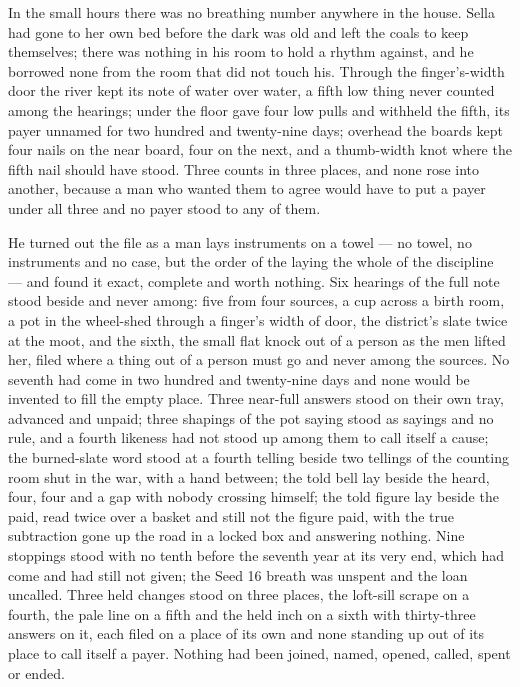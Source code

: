 In the small hours there was no breathing number anywhere in the house. Sella had gone to her own bed before the dark was old and left the coals to keep themselves; there was nothing in his room to hold a rhythm against, and he borrowed none from the room that did not touch his. Through the finger's-width door the river kept its note of water over water, a fifth low thing never counted among the hearings; under the floor  gave four low pulls and withheld the fifth, its payer unnamed for two hundred and twenty-nine days; overhead the boards kept four nails on the near board, four on the next, and a thumb-width knot where the fifth nail should have stood. Three counts in three places, and none rose into another, because a man who wanted them to agree would have to put a payer under all three and no payer stood to any of them.

He turned out the file as a man lays instruments on a towel --- no towel, no instruments and no case, but the order of the laying the whole of the discipline --- and found it exact, complete and worth nothing. Six hearings of the full note stood beside and never among: five from four sources, a cup across a birth room, a pot in the wheel-shed through a finger's width of door, the district's slate twice at the moot, and the sixth, the small flat knock out of a person as the men lifted her, filed where a thing out of a person must go and never among the sources. No seventh had come in two hundred and twenty-nine days and none would be invented to fill the empty place. Three near-full answers stood on their own tray, advanced and unpaid; three shapings of the pot saying stood as sayings and no rule, and a fourth likeness had not stood up among them to call itself a cause; the burned-slate word stood at a fourth telling beside two tellings of the counting room shut in the war, with a hand between; the told bell lay beside the heard, four, four and a gap with nobody crossing himself; the told figure lay beside the paid, read twice over a basket and still not the figure paid, with the true subtraction gone up the road in a locked box and answering nothing. Nine stoppings stood with no tenth before the seventh year at its very end, which had come and had still not given; the Seed 16 breath was unspent and the loan uncalled. Three held changes stood on three places, the loft-sill scrape on a fourth, the pale line on a fifth and the held inch on a sixth with thirty-three answers on it, each filed on a place of its own and none standing up out of its place to call itself a payer. Nothing had been joined, named, opened, called, spent or ended.

